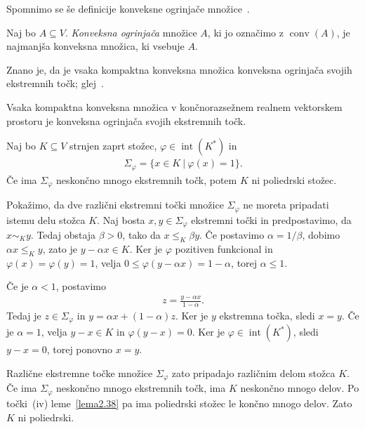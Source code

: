 \documentclass[mat2, tisk]{fmfdelo}
\begin{document}
Spomnimo se še definicije konveksne ogrinjače
množice~\cite[str.~12]{rockafellar}.

\begin{definicija}
Naj bo $A\subseteq V$. \emph{Konveksna ogrinjača} množice
$A$, ki jo označimo z $\operatorname{conv}(A)$,
je najmanjša konveksna množica, ki vsebuje $A$.
\end{definicija}

Znano je, da je vsaka kompaktna konveksna množica konveksna ogrinjača
svojih ekstremnih točk; glej~\cite{niculescu2006convex}.

\begin{trditev}\label{konv-ogr}
Vsaka kompaktna konveksna množica v končnorazsežnem realnem vektorskem
prostoru je konveksna ogrinjača svojih ekstremnih točk.
\end{trditev}

\begin{posledica}\label{posledica:ekstremne_tocke_nepoliedrski}
Naj bo $K\subseteq V$ strnjen zaprt stožec,
$\varphi\in\operatorname{int}(K^*)$ in
\begin{align*}
\Sigma_\varphi=\{x\in K ~|~ \varphi(x)=1\}.
\end{align*}
Če ima $\Sigma_\varphi$ neskončno mnogo ekstremnih točk, potem
$K$ ni poliedrski stožec.
\end{posledica}

\begin{dokaz}
Pokažimo, da dve različni ekstremni točki množice $\Sigma_\varphi$
ne moreta pripadati istemu delu stožca $K$. Naj bosta
$x,y\in\Sigma_\varphi$ ekstremni točki in predpostavimo, da
$x\sim_K y$. Tedaj obstaja $\beta>0$, tako da $x\leq_K\beta y$.
Če postavimo $\alpha=1/\beta$, dobimo $\alpha x\leq_K y$, zato je
$y-\alpha x\in K$.
Ker je $\varphi$ pozitiven funkcional in
$\varphi(x)=\varphi(y)=1$, velja
$0\leq\varphi(y-\alpha x)=1-\alpha$,
torej $\alpha\leq1$.

Če je $\alpha<1$, postavimo
\begin{align*}
z=\frac{y-\alpha x}{1-\alpha}.
\end{align*}
Tedaj je $z\in\Sigma_\varphi$ in
$y=\alpha x+(1-\alpha)z$.
Ker je $y$ ekstremna točka, sledi $x=y$.
Če je $\alpha=1$, velja $y-x\in K$ in
$\varphi(y-x)=0$. Ker je $\varphi\in\operatorname{int}(K^*)$,
sledi $y-x=0$, torej ponovno $x=y$.

Različne ekstremne točke množice $\Sigma_\varphi$ zato pripadajo
različnim delom stožca $K$. Če ima $\Sigma_\varphi$ neskončno mnogo
ekstremnih točk, ima $K$ neskončno mnogo delov. Po točki~(iv)
leme~\ref{lema2.38} pa ima poliedrski stožec le končno mnogo delov.
Zato $K$ ni poliedrski.
\end{dokaz}
\end{document}
